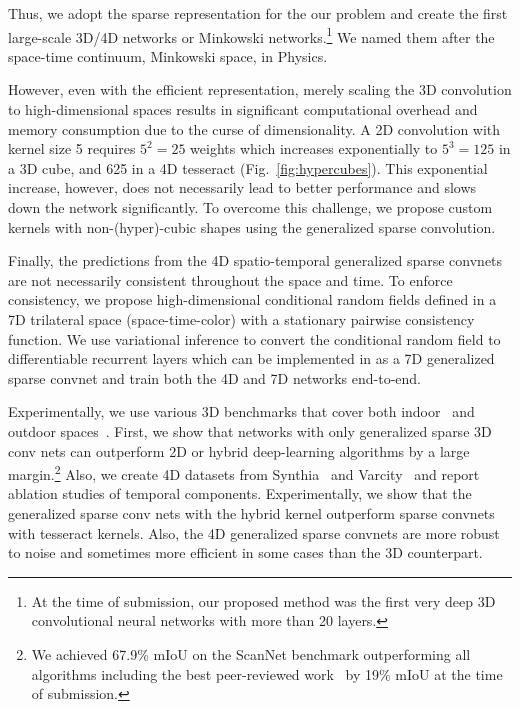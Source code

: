 Thus, we adopt the sparse representation for the our problem and create the first large-scale 3D/4D networks or Minkowski networks.\footnote{At the time of submission, our proposed method was the first very deep 3D convolutional neural networks with more than 20 layers.} We named them after the space-time continuum, Minkowski space, in Physics.

However, even with the efficient representation, merely scaling the 3D convolution to high-dimensional spaces results in significant computational overhead and memory consumption due to the curse of dimensionality. A 2D convolution with kernel size 5 requires $5^2=25$ weights which increases exponentially to $5^3 = 125$ in a 3D cube, and 625 in a 4D tesseract (Fig.~\ref{fig:hypercubes}). This exponential increase, however, does not necessarily lead to better performance and slows down the network significantly. To overcome this challenge, we propose custom kernels with non-(hyper)-cubic shapes using the generalized sparse convolution.


Finally, the predictions from the 4D spatio-temporal generalized sparse convnets are not necessarily consistent throughout the space and time. To enforce consistency, we propose high-dimensional conditional random fields defined in a 7D trilateral space (space-time-color) with a stationary pairwise consistency function. We use variational inference to convert the conditional random field to differentiable recurrent layers which can be implemented in as a 7D generalized sparse convnet and train both the 4D and 7D networks end-to-end.


Experimentally, we use various 3D benchmarks that cover both indoor~\cite{scannet, stanford3dis} and outdoor spaces~\cite{synthia, ruemonge2014}. First, we show that networks with only generalized sparse 3D conv nets can outperform 2D or hybrid deep-learning algorithms by a large margin.\footnote{We achieved 67.9\% mIoU on the ScanNet benchmark outperforming all algorithms including the best peer-reviewed work~\cite{3dmv} by 19\% mIoU at the time of submission.} Also, we create 4D datasets from Synthia~\cite{synthia} and Varcity~\cite{ruemonge2014} and report ablation studies of temporal components. Experimentally, we show that the generalized sparse conv nets with the hybrid kernel outperform sparse convnets with tesseract kernels. Also, the 4D generalized sparse convnets are more robust to noise and sometimes more efficient in some cases than the 3D counterpart.
